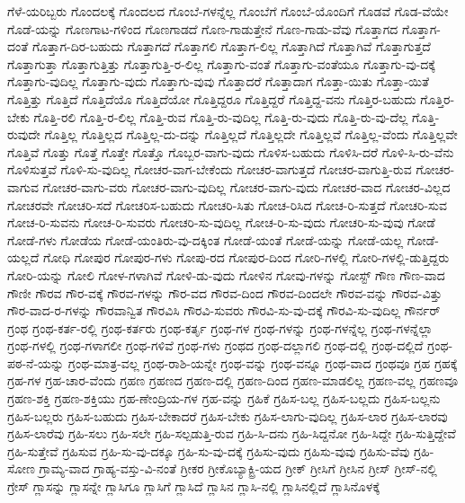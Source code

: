 {ಗೆಳೆ-ಯರಿಬ್ಬರು
ಗೊಂದಲಕ್ಕೆ
ಗೊಂದಲದ
ಗೊಂಬೆ-ಗಳನ್ನೆಲ್ಲ
ಗೊಂಬೆಗೆ
ಗೊಂಬೆ-ಯೊಂದಿಗೆ
ಗೊಡವೆ
ಗೊಡ-ವೆಯೇ
ಗೊಡೆ-ಯನ್ನು
ಗೊಣಗಾಟ-ಗಳಿಂದ
ಗೊಣಗಾಡದೆ
ಗೊಣ-ಗಾಡುತ್ತೇನೆ
ಗೊಣ-ಗಾಡು-ವೆವು
ಗೊತ್ತಾಗದ
ಗೊತ್ತಾಗ-ದಂತೆ
ಗೊತ್ತಾಗ-ದಿರ-ಬಹುದು
ಗೊತ್ತಾಗದೆ
ಗೊತ್ತಾಗಲಿ
ಗೊತ್ತಾಗ-ಲಿಲ್ಲ
ಗೊತ್ತಾಗಿದೆ
ಗೊತ್ತಾಗಿವೆ
ಗೊತ್ತಾಗುತ್ತದೆ
ಗೊತ್ತಾಗುತ್ತಾ
ಗೊತ್ತಾಗುತ್ತಿತ್ತು
ಗೊತ್ತಾಗುತ್ತಿ-ರ-ಲಿಲ್ಲ
ಗೊತ್ತಾಗು-ವಂತೆ
ಗೊತ್ತಾಗು-ವಂತೆಯೂ
ಗೊತ್ತಾಗು-ವು-ದಕ್ಕೆ
ಗೊತ್ತಾಗು-ವುದಿಲ್ಲ
ಗೊತ್ತಾಗು-ವುದು
ಗೊತ್ತಾಗು-ವುವು
ಗೊತ್ತಾದರೆ
ಗೊತ್ತಾದಾಗ
ಗೊತ್ತಾ-ಯಿತು
ಗೊತ್ತಾ-ಯಿತೆ
ಗೊತ್ತಿತ್ತು
ಗೊತ್ತಿದೆ
ಗೊತ್ತಿದೆಯೊ
ಗೊತ್ತಿದೆಯೋ
ಗೊತ್ತಿದ್ದರೂ
ಗೊತ್ತಿದ್ದರೆ
ಗೊತ್ತಿದ್ದ-ವನು
ಗೊತ್ತಿರ-ಬಹುದು
ಗೊತ್ತಿರ-ಬೇಕು
ಗೊತ್ತಿ-ರಲಿ
ಗೊತ್ತಿ-ರ-ಲಿಲ್ಲ
ಗೊತ್ತಿ-ರುವ
ಗೊತ್ತಿ-ರು-ವುದಿಲ್ಲ
ಗೊತ್ತಿ-ರು-ವುದು
ಗೊತ್ತಿ-ರು-ವು-ದೆಲ್ಲ
ಗೊತ್ತಿ-ರುವುದೇ
ಗೊತ್ತಿಲ್ಲ
ಗೊತ್ತಿಲ್ಲದ
ಗೊತ್ತಿಲ್ಲ-ದು-ದನ್ನು
ಗೊತ್ತಿಲ್ಲದೆ
ಗೊತ್ತಿಲ್ಲದೇ
ಗೊತ್ತಿಲ್ಲವೆ
ಗೊತ್ತಿಲ್ಲ-ವೆಂದು
ಗೊತ್ತಿಲ್ಲವೇ
ಗೊತ್ತಿವೆ
ಗೊತ್ತು
ಗೊತ್ತೆ
ಗೊತ್ತೇ
ಗೊತ್ತೊ
ಗೊಬ್ಬರ-ವಾಗು-ವುದು
ಗೊಳಿಸ-ಬಹುದು
ಗೊಳಿಸಿ-ದರೆ
ಗೊಳಿ-ಸಿ-ರು-ವೆನು
ಗೊಳಿಸುತ್ತವೆ
ಗೊಳಿ-ಸು-ವುದಿಲ್ಲ
ಗೋಚರ-ವಾಗ-ಬೇಕೆಂದು
ಗೋಚರ-ವಾಗುತ್ತದೆ
ಗೋಚರ-ವಾಗುತ್ತಿ-ರುವ
ಗೋಚರ-ವಾಗುವ
ಗೋಚರ-ವಾಗು-ವರು
ಗೋಚರ-ವಾಗು-ವುದಿಲ್ಲ
ಗೋಚರ-ವಾಗು-ವುದು
ಗೋಚರ-ವಾದ
ಗೋಚರ-ವಿಲ್ಲದ
ಗೋಚರವೇ
ಗೋಚರಿ-ಸದೆ
ಗೋಚರಿಸ-ಬಹುದು
ಗೋಚರಿ-ಸಿತು
ಗೋಚ-ರಿಸಿದ
ಗೋಚ-ರಿ-ಸುತ್ತದೆ
ಗೋಚರಿ-ಸುವ
ಗೋಚ-ರಿ-ಸುವನು
ಗೋಚ-ರಿ-ಸುವರು
ಗೋಚರಿ-ಸು-ವುದಿಲ್ಲ
ಗೋಚ-ರಿ-ಸು-ವುದು
ಗೋಚರಿ-ಸು-ವುವು
ಗೋಡೆ
ಗೋಡೆ-ಗಳು
ಗೋಡೆಯ
ಗೋಡೆ-ಯಂತಿರು-ವು-ದಕ್ಕಿಂತ
ಗೋಡೆ-ಯಂತೆ
ಗೋಡೆ-ಯನ್ನು
ಗೋಡೆ-ಯಲ್ಲ
ಗೋಡೆ-ಯಲ್ಲದೆ
ಗೋಧಿ
ಗೋಪುರ
ಗೋಪುರ-ಗಳು
ಗೋಪು-ರದ
ಗೋಪುರ-ದಿಂದ
ಗೋರಿ-ಗಳಲ್ಲಿ
ಗೋರಿ-ಗಳಲ್ಲಿ-ಡುತ್ತಿದ್ದರು
ಗೋರಿ-ಯನ್ನು
ಗೋಲಿ
ಗೋಳ-ಗಳಾಗಿವೆ
ಗೋಳಿ-ಡು-ವುದು
ಗೋಳಿನ
ಗೋವು-ಗಳನ್ನು
ಗೋಸ್ಟ್
ಗೌಣ
ಗೌಣ-ವಾದ
ಗೌಣೀ
ಗೌರವ
ಗೌರ-ವಕ್ಕೆ
ಗೌರವ-ಗಳನ್ನು
ಗೌರ-ವದ
ಗೌರವ-ದಿಂದ
ಗೌರವ-ದಿಂದಲೇ
ಗೌರವ-ವನ್ನು
ಗೌರವ-ವಿತ್ತು
ಗೌರ-ವಾದ-ರ-ಗಳನ್ನು
ಗೌರವಾನ್ವಿತ
ಗೌರವಿಸಿ
ಗೌರವಿ-ಸುವರು
ಗೌರವಿ-ಸು-ವು-ದಕ್ಕೆ
ಗೌರವಿ-ಸು-ವುದಿಲ್ಲ
ಗೌರ್ನರ್
ಗ್ರಂಥ
ಗ್ರಂಥ-ಕರ್ತ-ರಲ್ಲಿ
ಗ್ರಂಥ-ಕರ್ತರು
ಗ್ರಂಥ-ಕರ್ತೃ
ಗ್ರಂಥ-ಗಳ
ಗ್ರಂಥ-ಗಳನ್ನು
ಗ್ರಂಥ-ಗಳನ್ನೆಲ್ಲ
ಗ್ರಂಥ-ಗಳನ್ನೆಲ್ಲಾ
ಗ್ರಂಥ-ಗಳಲ್ಲಿ
ಗ್ರಂಥ-ಗಳಾಗಲೀ
ಗ್ರಂಥ-ಗಳಿವೆ
ಗ್ರಂಥ-ಗಳು
ಗ್ರಂಥದ
ಗ್ರಂಥ-ದಲ್ಲಾಗಲಿ
ಗ್ರಂಥ-ದಲ್ಲಿ
ಗ್ರಂಥ-ದಲ್ಲಿದೆ
ಗ್ರಂಥ-ಪಠ-ನೆ-ಯನ್ನು
ಗ್ರಂಥ-ಮಾತ್ರ-ವಲ್ಲ
ಗ್ರಂಥ-ರಾಶಿ-ಯನ್ನೇ
ಗ್ರಂಥ-ವನ್ನು
ಗ್ರಂಥ-ವನ್ನೂ
ಗ್ರಂಥ-ವಾದ
ಗ್ರಂಥವೂ
ಗ್ರಹ
ಗ್ರಹಕ್ಕೆ
ಗ್ರಹ-ಗಳ
ಗ್ರಹ-ಚಾರ-ವೆಂದು
ಗ್ರಹಣ
ಗ್ರಹಣದ
ಗ್ರಹಣ-ದಲ್ಲಿ
ಗ್ರಹಣ-ದಿಂದ
ಗ್ರಹಣ-ಮಾಡಲಿಲ್ಲ
ಗ್ರಹಣ-ವಲ್ಲ
ಗ್ರಹಣವೂ
ಗ್ರಹಣ-ಶಕ್ತಿ
ಗ್ರಹಣ-ಶಕ್ತಿಯು
ಗ್ರಹ-ಣೇಂದ್ರಿಯ-ಗಳ
ಗ್ರಹ-ವನ್ನು
ಗ್ರಹಿಕೆ
ಗ್ರಹಿಸ-ಬಲ್ಲ
ಗ್ರಹಿಸ-ಬಲ್ಲದು
ಗ್ರಹಿಸ-ಬಲ್ಲನು
ಗ್ರಹಿಸ-ಬಲ್ಲರು
ಗ್ರಹಿಸ-ಬಹುದು
ಗ್ರಹಿಸ-ಬೇಕಾದರೆ
ಗ್ರಹಿಸ-ಬೇಕು
ಗ್ರಹಿಸ-ಲಾಗು-ವುದಿಲ್ಲ
ಗ್ರಹಿಸ-ಲಾರ
ಗ್ರಹಿಸ-ಲಾರವು
ಗ್ರಹಿಸ-ಲಾರೆವು
ಗ್ರಹಿ-ಸಲು
ಗ್ರಹಿ-ಸಲೇ
ಗ್ರಹಿ-ಸಲ್ಪಡುತ್ತಿ-ರುವ
ಗ್ರಹಿ-ಸಿ-ದನು
ಗ್ರಹಿ-ಸಿದ್ದನೋ
ಗ್ರಹಿ-ಸಿದ್ದೇ
ಗ್ರಹಿ-ಸುತ್ತಿದ್ದೇವೆ
ಗ್ರಹಿ-ಸುತ್ತೇವೆ
ಗ್ರಹಿಸುವ
ಗ್ರಹಿ-ಸು-ವು-ದಕ್ಕೂ
ಗ್ರಹಿ-ಸು-ವು-ದಕ್ಕೆ
ಗ್ರಹಿಸು-ವುದು
ಗ್ರಹಿಸು-ವುವು
ಗ್ರಹಿಸು-ವೆವು
ಗ್ರಹಿ-ಸೋಣ
ಗ್ರಾಮ್ಯ-ವಾದ
ಗ್ರಾಹ್ಯ-ವಸ್ತು-ವಿ-ನಂತೆ
ಗ್ರೀಕರ
ಗ್ರೀಕೊಬ್ಯಾಕ್ಟ್ರಿ-ಯದ
ಗ್ರೀಕ್
ಗ್ರೀಸಿಗೆ
ಗ್ರೀಸಿನ
ಗ್ರೀಸ್
ಗ್ರೀಸ್-ನಲ್ಲಿ
ಗ್ರೇಸ್
ಗ್ಲಾಸನ್ನು
ಗ್ಲಾಸನ್ನೇ
ಗ್ಲಾಸಿಗೂ
ಗ್ಲಾಸಿಗೆ
ಗ್ಲಾಸಿದೆ
ಗ್ಲಾಸಿನ
ಗ್ಲಾಸಿ-ನಲ್ಲಿ
ಗ್ಲಾಸಿನಲ್ಲಿದೆ
ಗ್ಲಾಸಿನೊಳಕ್ಕೆ
}
